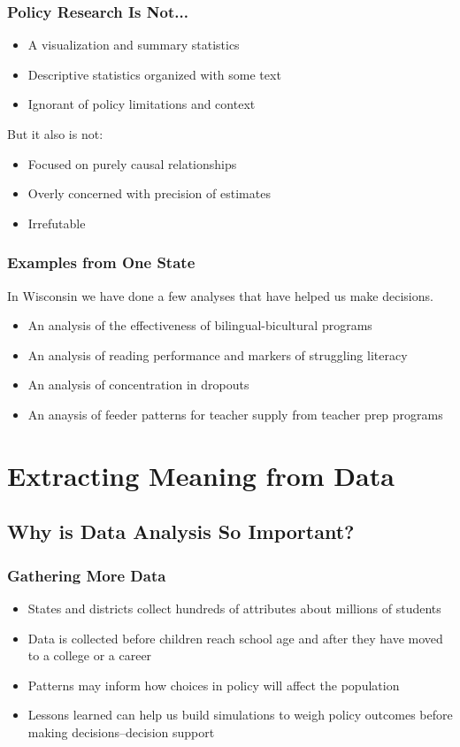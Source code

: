 \documentclass{beamer}
\begin{document}
\begin{frame}
\frametitle{Policy Research Is Not...}
  \begin{itemize}
  \item A visualization and summary statistics
  \item Descriptive statistics organized with some text
  \item Ignorant of policy limitations and context
  \end{itemize}
\begin{center}
But it also is not:
\end{center}
  \begin{itemize}
    \item Focused on purely causal relationships
    \item Overly concerned with precision of estimates
    \item Irrefutable 
  \end{itemize}
\end{frame}

\begin{frame}
\frametitle{Examples from One State}
  In Wisconsin we have done a few analyses that have helped us make decisions. 
  \begin{itemize}
  \item An analysis of the effectiveness of bilingual-bicultural programs
  \pause
  \item An analysis of reading performance and markers of struggling literacy
  \pause
  \item An analysis of concentration in dropouts
  \pause
  \item An anaysis of feeder patterns for teacher supply from teacher prep programs
  \end{itemize}
\end{frame}


\section{Extracting Meaning from Data}
\label{sec:extrct-meaning}

\subsection{Why is Data Analysis So Important?}
\begin{frame}
\frametitle{Gathering More Data}
\begin{itemize}
  \item States and districts collect hundreds of attributes about millions of students
  \item Data is collected before children reach school age and after they have moved to a college or a career
  \item Patterns may inform how choices in policy will affect the population
  \item Lessons learned can help us build simulations to weigh policy outcomes before making decisions--decision support
\end{itemize}
\end{frame}
\end{document}
